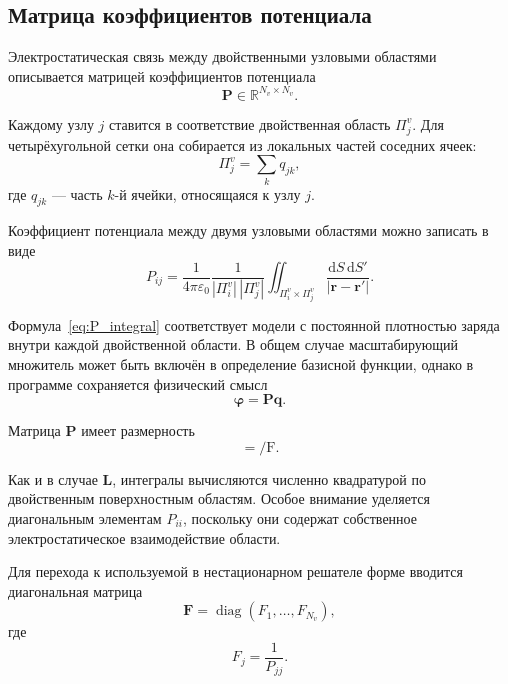 \documentclass[12pt,a4paper]{article}
\newcommand{\vect}[1]{\boldsymbol{#1}}
\newcommand{\matr}[1]{\mathbf{#1}}
\begin{document}
\subsection{Матрица коэффициентов потенциала}

Электростатическая связь между двойственными узловыми областями
описывается матрицей коэффициентов потенциала
\begin{equation}
    \matr P\in\mathbb R^{N_v\times N_v}.
\end{equation}

Каждому узлу $j$ ставится в соответствие двойственная область
$\Pi_j^v$. Для четырёхугольной сетки она собирается из локальных
частей соседних ячеек:
\begin{equation}
    \Pi_j^v
    =
    \sum_k q_{jk},
\end{equation}
где $q_{jk}$ --- часть $k$-й ячейки, относящаяся к узлу $j$.

Коэффициент потенциала между двумя узловыми областями можно записать
в виде
\begin{equation}
    P_{ij}
    =
    \frac{1}{4\pi\varepsilon_0}
    \frac{1}{
        |\Pi_i^v|\,
        |\Pi_j^v|
    }
    \iint_{\Pi_i^v\times\Pi_j^v}
    \frac{
        \mathrm dS\,\mathrm dS'
    }{
        |\vect r-\vect r'|
    }.
    \label{eq:P_integral}
\end{equation}

Формула~\eqref{eq:P_integral} соответствует модели с постоянной
плотностью заряда внутри каждой двойственной области. В общем случае
масштабирующий множитель может быть включён в определение базисной
функции, однако в программе сохраняется физический смысл
\begin{equation}
    \vect\varphi
    =
    \matr P\vect q.
\end{equation}

Матрица $\matr P$ имеет размерность
\begin{equation}
    [P_{ij}]=\si{\per\farad}.
\end{equation}

Как и в случае $\matr L$, интегралы вычисляются численно квадратурой
по двойственным поверхностным областям. Особое внимание уделяется
диагональным элементам $P_{ii}$, поскольку они содержат собственное
электростатическое взаимодействие области.

Для перехода к используемой в нестационарном решателе форме вводится
диагональная матрица
\begin{equation}
    \matr F
    =
    \operatorname{diag}
    \left(
        F_1,\ldots,F_{N_v}
    \right),
\end{equation}
где
\begin{equation}
    F_j
    =
    \frac{1}{P_{jj}}.
\end{equation}
\end{document}
